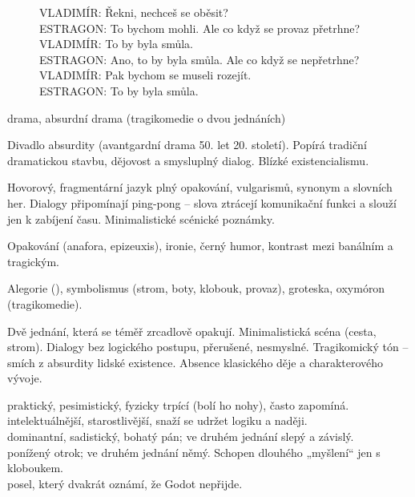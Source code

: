 \documentclass[FGBook.tex]{subfiles}
\begin{document}

\noindent\begin{figure}\footnotesize
{}
\setlength{\parindent}{3pt}
VLADIMÍR: Řekni, nechceš se oběsit?\\
ESTRAGON: To bychom mohli. Ale co když se provaz přetrhne?\\
VLADIMÍR: To by byla smůla.\\
ESTRAGON: Ano, to by byla smůla. Ale co když se nepřetrhne?\\
VLADIMÍR: Pak bychom se museli rozejít.\\
ESTRAGON: To by byla smůla.
\end{figure}


\noindent drama, absurdní drama (tragikomedie o dvou jednáních)

\noindent Divadlo absurdity (avantgardní drama 50. let 20. století). Popírá tradiční dramatickou stavbu, dějovost a smysluplný dialog. Blízké existencialismu.

\noindent Hovorový, fragmentární jazyk plný opakování, vulgarismů, synonym a slovních her. Dialogy připomínají ping-pong – slova ztrácejí komunikační funkci a slouží jen k zabíjení času. Minimalistické scénické poznámky.

\noindent Opakování (anafora, epizeuxis), ironie, černý humor, kontrast mezi banálním a tragickým.

\noindent Alegorie (), symbolismus (strom, boty, klobouk, provaz), groteska, oxymóron (tragikomedie).

\noindent Dvě jednání, která se téměř zrcadlově opakují. Minimalistická scéna (cesta, strom). Dialogy bez logického postupu, přerušené, nesmyslné. Tragikomický tón – smích z absurdity lidské existence. Absence klasického děje a charakterového vývoje.

\noindent 
{} praktický, pesimistický, fyzicky trpící (bolí ho nohy), často zapomíná.\\
 intelektuálnější, starostlivější, snaží se udržet logiku a naději.\\
 dominantní, sadistický, bohatý pán; ve druhém jednání slepý a závislý.\\
 ponížený otrok; ve druhém jednání němý. Schopen dlouhého „myšlení“ jen s kloboukem.\\
 posel, který dvakrát oznámí, že Godot nepřijde.
\end{document}
